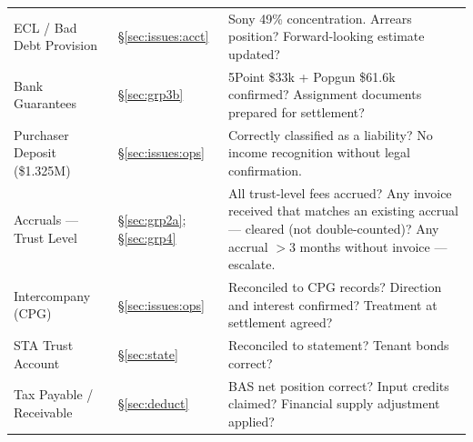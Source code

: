 \documentclass[10pt,a4paper]{article}
\begin{document}
{\begin{tabularx}{\textwidth}{@{} L{3.4cm} L{1.6cm} X @{}}
ECL / Bad Debt Provision & \S\ref{sec:issues:acct} & Sony 49\% concentration. Arrears position? Forward-looking estimate updated? \\
Bank Guarantees & \S\ref{sec:grp3b} & 5Point \$33k + Popgun \$61.6k confirmed? Assignment documents prepared for settlement? \\
Purchaser Deposit (\$1.325M) & \S\ref{sec:issues:ops} & Correctly classified as a liability? No income recognition without legal confirmation. \\
Accruals --- Trust Level & \S\ref{sec:grp2a}; \S\ref{sec:grp4} & All trust-level fees accrued? Any invoice received that matches an existing accrual --- cleared (not double-counted)? Any accrual $>$3 months without invoice --- escalate. \\
Intercompany (CPG) & \S\ref{sec:issues:ops} & Reconciled to CPG records? Direction and interest confirmed? Treatment at settlement agreed? \\
STA Trust Account & \S\ref{sec:state} & Reconciled to statement? Tenant bonds correct? \\
Tax Payable / Receivable & \S\ref{sec:deduct} & BAS net position correct? Input credits claimed? Financial supply adjustment applied? \\
\bottomrule
\end{tabularx}}
\end{document}
